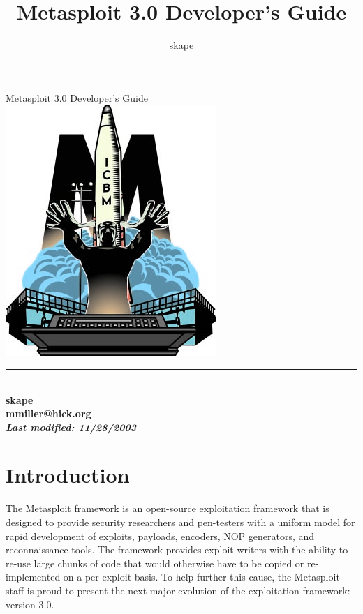 \documentclass{report}
\begin{document}
\title{Metasploit 3.0 Developer's Guide}
\author{skape}

\begin{titlepage}
    \begin{center}
        \huge{{Metasploit 3.0 Developer's Guide}} \\[10mm]
        \includegraphics{logo} \\[15mm]
        \rule{10cm}{1pt} \\[8mm]
        \small\bf{skape} \\
        \small\bf{mmiller@hick.org} \\[4mm]
        \textit{Last modified: \small{11/28/2003}}
    \end{center}
\end{titlepage}

\tableofcontents

\setlength{\parindent}{0pt} \setlength{\parskip}{8pt}

\chapter{Introduction}

\par
The Metasploit framework is an open-source exploitation framework
that is designed to provide security researchers and pen-testers
with a uniform model for rapid development of exploits, payloads,
encoders, NOP generators, and reconnaissance tools.  The framework
provides exploit writers with the ability to re-use large chunks of
code that would otherwise have to be copied or re-implemented on a
per-exploit basis.  To help further this cause, the Metasploit staff
is proud to present the next major evolution of the exploitation
framework: version 3.0.
\end{document}
